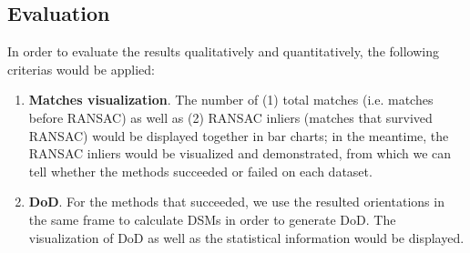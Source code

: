 \subsection{Evaluation}
In order to evaluate the results qualitatively and quantitatively, the following criterias would be applied:\\
\begin{enumerate}
    \item \textbf{Matches visualization}. The number of (1) total matches (i.e. matches before RANSAC) as well as (2) RANSAC inliers (matches that survived RANSAC) would be displayed together in bar charts; in the meantime, the RANSAC inliers would be visualized and demonstrated, from which we can tell whether the methods succeeded or failed on each dataset.
    \item \textbf{\ac{DoD}}. For the methods that succeeded, we use the resulted orientations in the same frame to calculate DSMs in order to generate \ac{DoD}. The visualization of \ac{DoD} as well as the statistical information would be displayed.
\end{enumerate}

